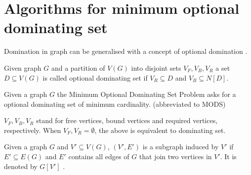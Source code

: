 \section{Algorithms for minimum optional dominating set}
Domination in graph can be generalised with a concept of optional domination \cite{SCHIERMEYER20083291}.
\begin{definition}
    Given graph $G$ and a partition of $V(G)$ into disjoint sets $V_F, V_B, V_R$ a set $D \subseteq V(G)$ is called optional dominating set if $V_R \subseteq D$ and $V_B \subseteq N[D]$.
\end{definition}
\begin{definition}
Given a graph $G$ the Minimum Optional Dominating Set Problem asks for a optional dominating set of minimum cardinality. (abbreviated to MODS)
\end{definition}
$V_F, V_B, V_R$ stand for free vertices, bound vertices and required vertices, respectively.
When $V_F, V_R = \emptyset$, the above is equivalent to dominating set. 

\begin{definition}
    Given a graph $G$ and $V' \subseteq V(G)$, $(V', E')$ is a subgraph induced by $V'$ if $E' \subseteq E(G)$ and $E'$ contains all edges of $G$ that join two vertices in $V'$. It is denoted by $G[V']$ \cite{bollobas1998modern}.
\end{definition}

